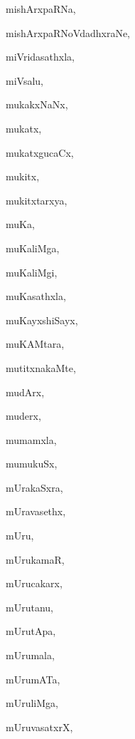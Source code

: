 \begin{multicols}{3}
{\noindent
{mishArxpaRNa}, \pageref{mishArxpaRNa}

\noindent
{mishArxpaRNoVdadhxraNe}, \pageref{mishArxpaRNoVdadhxraNe}

\noindent
{miVridasathxla}, \pageref{miVridasathxla}

\noindent
{miVsalu}, \pageref{miVsalu}

\noindent
{mukakxNaNx}, \pageref{mukakxNaNx}

\noindent
{mukatx}, \pageref{mukatx}

\noindent
{mukatxgucaCx}, \pageref{mukatxgucaCx}

\noindent
{mukitx}, \pageref{mukitx}

\noindent
{mukitxtarxya}, \pageref{mukitxtarxya}

\noindent
{muKa}, \pageref{muKa}

\noindent
{muKaliMga}, \pageref{muKaliMga}

\noindent
{muKaliMgi}, \pageref{muKaliMgi}

\noindent
{muKasathxla}, \pageref{muKasathxla}

\noindent
{muKayxshiSayx}, \pageref{muKayxshiSayx}

\noindent
{muKAMtara}, \pageref{muKAMtara}

\noindent
{mutitxnakaMte}, \pageref{mutitxnakaMte}

\noindent
{mudArx}, \pageref{mudArx}

\noindent
{muderx}, \pageref{muderx}

\noindent
{mumamxla}, \pageref{mumamxla}

\noindent
{mumukuSx}, \pageref{mumukuSx}

\noindent
{mUrakaSxra}, \pageref{mUrakaSxra}

\noindent
{mUravasethx}, \pageref{mUravasethx}

\noindent
{mUru}, \pageref{mUru}

\noindent
{mUrukamaR}, \pageref{mUrukamaR}

\noindent
{mUrucakarx}, \pageref{mUrucakarx}

\noindent
{mUrutanu}, \pageref{mUrutanu}

\noindent
{mUrutApa}, \pageref{mUrutApa}

\noindent
{mUrumala}, \pageref{mUrumala}

\noindent
{mUrumATa}, \pageref{mUrumATa}

\noindent
{mUruliMga}, \pageref{mUruliMga}

\noindent
{mUruvasatxrX}, \pageref{mUruvasatxrX}

}
\end{multicols}
